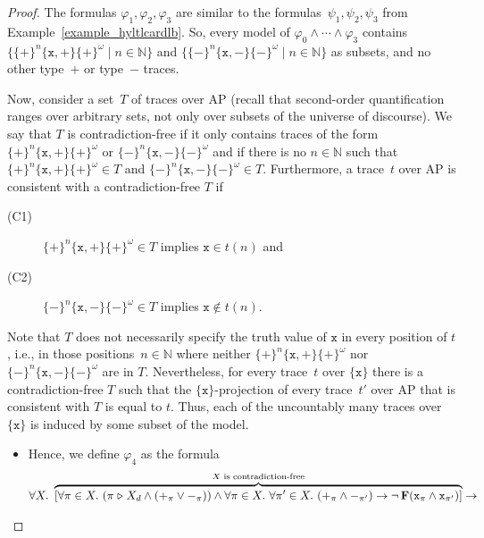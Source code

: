\documentclass[dvipsnames,10pt,a4paper]{amsart}
\theoremstyle{definition}
\theoremstyle{remark}
\newcommand{\nats}{\mathbb{N}}
\renewcommand{\phi}{\varphi}
\newcommand{\set}[1]{\{#1\}}
\newcommand{\F}{\mathop{\mathbf{F}\vphantom{a}}\nolimits}
\newcommand{\ap}[0]{\mathrm{AP}}
\newcommand{\unidisvar}{X_d}
\newcommand{\posprop}{\mathtt{+}}
\newcommand{\negprop}{\mathtt{-}}
\newcommand{\inprop}{\mathtt{x}}
\newcommand{\tracein}{\mathrel{\triangleright}}
\begin{document}
\begin{proof}
The formulas $\phi_1, \phi_2, \phi_3$ are similar to the formulas~$\psi_1, \psi_2, \psi_3$ from Example~\ref{example_hyltlcardlb}. 
So, every model of $\phi_0 \wedge \cdots \wedge \phi_3$ contains $\set{\set{\posprop}^n \set{\inprop,\posprop} \set{\posprop}^\omega \mid n\in\nats}$ and $\set{\set{\negprop}^n \set{\inprop,\negprop} \set{\negprop}^\omega \mid n\in\nats}$ as subsets, and no other type~$\posprop$ or type~$\negprop$ traces.

Now, consider a set~$T$ of traces over $\ap$ (recall that second-order quantification ranges over arbitrary sets, not only over subsets of the universe of discourse).
We say that $T$ is contradiction-free if it only contains traces of the form~$\set{\posprop}^n \set{\inprop,\posprop} \set{\posprop}^\omega$ or $\set{\negprop}^n \set{\inprop,\negprop} \set{\negprop}^\omega$ and if there is no $n \in \nats$ such that $\set{\posprop}^n \set{\inprop,\posprop} \set{\posprop}^\omega \in T$ and $\set{\negprop}^n \set{\inprop,\negprop} \set{\negprop}^\omega \in T$. 
Furthermore, a trace~$t$ over $\ap$ is consistent with a contradiction-free $T$ if 
\begin{description}
    \item[(C1)] $\set{\posprop}^n \set{\inprop,\posprop} \set{\posprop}^\omega \in T$ implies $\inprop\in t(n)$ and
    \item[(C2)] $\set{\negprop}^n \set{\inprop,\negprop} \set{\negprop}^\omega \in T$ implies $\inprop\notin t(n)$.
\end{description}
Note that $T$ does not necessarily specify the truth value of $\inprop$ in every position of $t$, i.e., in those positions~$n\in\nats$ where neither $\set{\posprop}^n \set{\inprop,\posprop} \set{\posprop}^\omega$ nor $\set{\negprop}^n \set{\inprop,\negprop} \set{\negprop}^\omega$ are in $T$.
Nevertheless, for every trace~$t$ over $\set{\inprop}$ there is a contradiction-free $T$ such that the $\set{\inprop}$-projection of every trace~$t'$ over $\ap$ that is consistent with $T$ is equal to $t$. 
Thus, each of the uncountably many traces over $\set{\inprop}$ is induced by some subset of the model.
\begin{itemize}
\item Hence, we define $\phi_4$ as the formula
\begin{align*}
\forall X.\ {}&{} \overbrace{[ \forall \pi \in X.\ (\pi\tracein \unidisvar \wedge (\posprop_\pi \vee \negprop_\pi)) \wedge \forall \pi \in X.\ \forall \pi' \in X.\ (\posprop_\pi \wedge \negprop_{\pi'}) \rightarrow \neg \F(\inprop_{\pi} \wedge \inprop_{\pi'}) ]}^{\text{$X$ is contradiction-free}} \rightarrow \\

\end{align*}
\end{itemize}
\end{proof}
\end{document}
